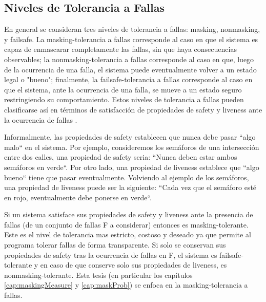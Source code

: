\subsection{Niveles de Tolerancia a Fallas}
En general se consideran tres niveles de tolerancia a fallas: masking, nonmasking, y failsafe. La masking-tolerancia a fallas corresponde al caso en que el sistema es capaz de enmascarar completamente las fallas, sin que haya consecuencias observables; la nonmasking-tolerancia a fallas corresponde al caso en que, luego de la ocurrencia de una falla, el sistema puede eventualmente volver a un estado legal o "bueno"; finalmente, la failsafe-tolerancia a fallas corresponde al caso en que el sistema, ante la ocurrencia de una falla, se mueve a un estado seguro restringiendo su comportamiento. Estos niveles de tolerancia a fallas pueden clasificarse así en términos de satisfacción de propiedades de safety y liveness ante la ocurrencia de fallas \cite{Gartner99}.

Informalmente, las propiedades de safety establecen que nunca debe pasar ``algo malo`` en el sistema. Por ejemplo, consideremos los semáforos de una intersección entre dos calles, una propiedad de safety seria: ``Nunca deben estar ambos semáforos en verde``.
Por otro lado, una propiedad de liveness establece que ``algo bueno`` tiene que pasar eventualmente. Volviendo al ejemplo de los semáforos, una propiedad de liveness puede ser la siguiente: ``Cada vez que el semáforo esté en rojo, eventualmente debe ponerse en verde``.

Si un sistema satisface sus propiedades de safety y liveness ante la presencia de fallas (de un conjunto de fallas F a considerar) entonces es masking-tolerante. Este es el nivel de tolerancia mas estricto, costoso y deseado ya que permite al programa tolerar fallas de forma transparente.
Si solo se conservan sus propiedades de safety tras la ocurrencia de fallas en F, el sistema es failsafe-tolerante y en caso de que conserve solo sus propiedades de liveness, es nonmasking-tolerante.
Esta tesis (en particular los capítulos \ref{cap:maskingMeasure} y \ref{cap:maskProb}) se enfoca en la masking-tolerancia a fallas.


